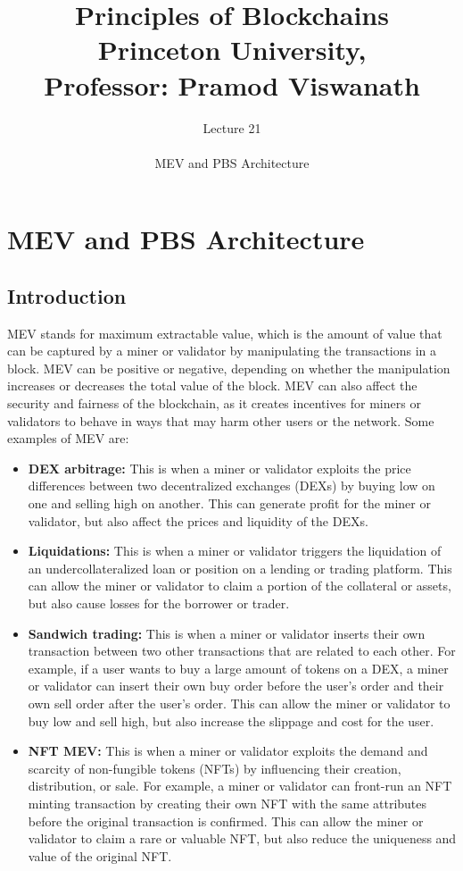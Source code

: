 \documentclass{report}
\title{\Huge{Principles of Blockchains \\ Princeton University,\\
		Professor: Pramod Viswanath}}
\author{\huge{Lecture 21} \\\\ MEV and PBS Architecture}
\begin{document}
\maketitle
\newpage%
\tableofcontents
\pagebreak

\chapter{MEV and PBS Architecture}
\section{Introduction}
MEV stands for maximum extractable value, which is the amount of value that can be captured by a miner or validator by manipulating the transactions in a block. MEV can be positive or negative, depending on whether the manipulation increases or decreases the total value of the block. MEV can also affect the security and fairness of the blockchain, as it creates incentives for miners or validators to behave in ways that may harm other users or the network.
Some examples of MEV are:
\begin{itemize}
	\item \textbf{DEX arbitrage:} This is when a miner or validator exploits the price differences between two decentralized exchanges (DEXs) by buying low on one and selling high on another. This can generate profit for the miner or validator, but also affect the prices and liquidity of the DEXs.
	\item \textbf{Liquidations:} This is when a miner or validator triggers the liquidation of an undercollateralized loan or position on a lending or trading platform. This can allow the miner or validator to claim a portion of the collateral or assets, but also cause losses for the borrower or trader.
	\item \textbf{Sandwich trading:} This is when a miner or validator inserts their own transaction between two other transactions that are related to each other. For example, if a user wants to buy a large amount of tokens on a DEX, a miner or validator can insert their own buy order before the user’s order and their own sell order after the user’s order. This can allow the miner or validator to buy low and sell high, but also increase the slippage and cost for the user.
	\item \textbf{NFT MEV:} This is when a miner or validator exploits the demand and scarcity of non-fungible tokens (NFTs) by influencing their creation, distribution, or sale. For example, a miner or validator can front-run an NFT minting transaction by creating their own NFT with the same attributes before the original transaction is confirmed. This can allow the miner or validator to claim a rare or valuable NFT, but also reduce the uniqueness and value of the original NFT.
\end{itemize}
\end{document}
